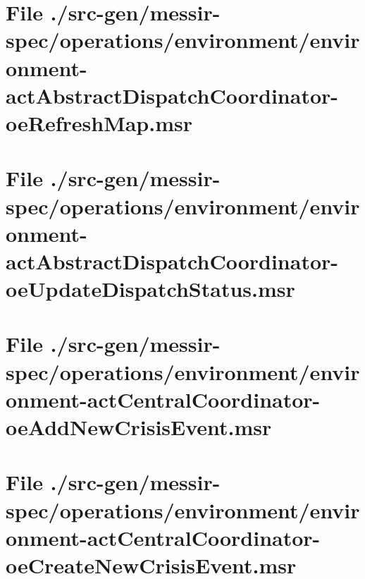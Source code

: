 \section[File /src-gen.../environment-actAbstractDispatchCoordinator-oeRefreshMap.msr]{File ./src-gen/messir-spec/operations/environment/environment-actAbstractDispatchCoordinator-oeRefreshMap.msr}
\scriptsize

\normalsize
	
\section[File /.../environment-actAbstractDispatchCoordinator-oeUpdateDispatchStatus.msr]{File ./src-gen/messir-spec/operations/environment/environment-actAbstractDispatchCoordinator-oeUpdateDispatchStatus.msr}
\scriptsize

\normalsize
	
\section[File /src-gen.../environment-actCentralCoordinator-oeAddNewCrisisEvent.msr]{File ./src-gen/messir-spec/operations/environment/environment-actCentralCoordinator-oeAddNewCrisisEvent.msr}
\scriptsize

\normalsize
	
\section[File /src-gen.../environment-actCentralCoordinator-oeCreateNewCrisisEvent.msr]{File ./src-gen/messir-spec/operations/environment/environment-actCentralCoordinator-oeCreateNewCrisisEvent.msr}
\scriptsize

\normalsize
	
